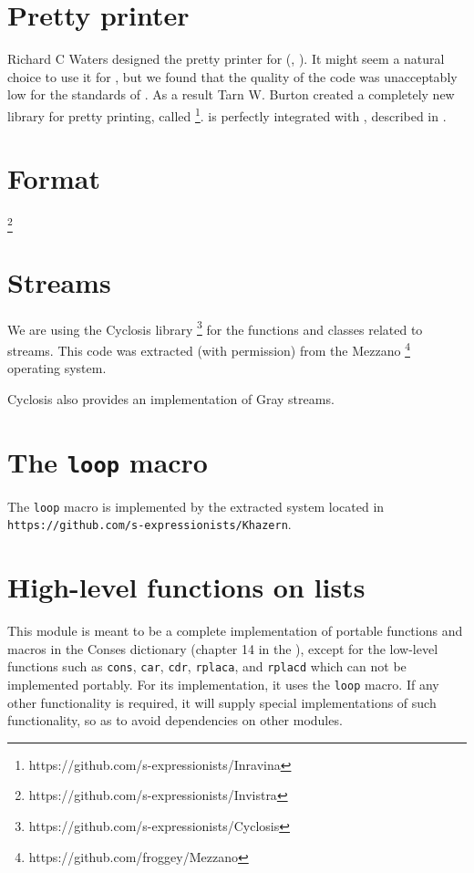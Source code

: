 \section{Pretty printer}
\label{sec-pretty-printer}

Richard C Waters designed the pretty printer for
\commonlisp{} (\cite{Waters89xp:a}, \cite{Waters:1992:UNC:1039991.1039996}).
It might seem a natural choice to use it for \sysname{}, but we found
that the quality of the code was unacceptably low for the standards of
\sysname{}.  As a result Tarn W. Burton created a completely new
library for pretty printing, called \inravina{}%
\footnote{https://github.com/s-expressionists/Inravina}.  \inravina{}
is perfectly integrated with \incless{}, described in
.

\section{Format}
\label{sec-format}

\footnote{https://github.com/s-expressionists/Invistra}

\section{Streams}
\label{sec-streams}

We are using the Cyclosis library%
\footnote{https://github.com/s-expressionists/Cyclosis} for the
\commonlisp{} functions and classes related to streams.  This code was
extracted (with permission) from the Mezzano%
\footnote{https://github.com/froggey/Mezzano}
operating system.

Cyclosis also provides an implementation of Gray streams.

\section{The \texttt{loop} macro} 
\label{sec-loop}

The \texttt{loop} macro is implemented by the extracted system
\khazern{} located in
\texttt{https://github.com/s-expressionists/Khazern}.

\section{High-level functions on lists}
\label{sec-constrictor}

This module is meant to be a complete implementation of portable
functions and macros in the Conses dictionary (chapter 14 in the
\hs{}), except for the low-level functions such as \texttt{cons},
\texttt{car}, \texttt{cdr}, \texttt{rplaca}, and \texttt{rplacd} which
can not be implemented portably.  For its implementation, it uses the
\texttt{loop} macro.  If any other functionality is required, it will
supply special implementations of such functionality, so as to avoid
dependencies on other modules.


